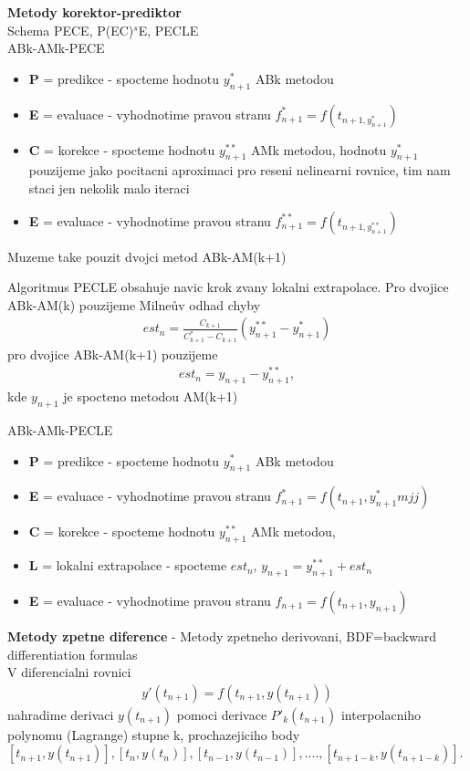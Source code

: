 \textbf{Metody korektor-prediktor} \\
Schema PECE, P(EC)$^{s}$E, PECLE \\
ABk-AMk-PECE
\begin{itemize}
\item \textbf{P} = predikce - spocteme hodnotu $y^{*}_{n+1}$ ABk metodou 
\item \textbf{E} = evaluace - vyhodnotime pravou stranu $f^{*}_{n+1}=f(t_{n+1,y^{*}_{n+1}})$
\item \textbf{C} = korekce - spocteme hodnotu $y^{**}_{n+1}$ AMk metodou, hodnotu $y^{*}_{n+1}$ pouzijeme jako pocitacni aproximaci pro reseni nelinearni rovnice, tim nam staci jen nekolik malo iteraci
\item \textbf{E} = evaluace - vyhodnotime pravou stranu $f^{**}_{n+1}=f(t_{n+1,y^{**}_{n+1}})$
\end{itemize}

Muzeme take pouzit dvojci metod ABk-AM(k+1)

Algoritmus PECLE obsahuje navic krok zvany lokalni extrapolace. Pro dvojice ABk-AM(k) pouzijeme Milneův odhad  chyby 
\begin{align}
est_{n}=\frac{C_{k+1}}{C^{*}_{k+1}-C_{k+1}}(y^{**}_{n+1}-y^{*}_{n+1})
\end{align}
pro dvojice ABk-AM(k+1) pouzijeme
\begin{align}
est_{n}=y_{n+1}-y^{**}_{n+1},
\end{align}
kde $y_{n+1}$ je spocteno metodou AM(k+1)

ABk-AMk-PECLE
\begin{itemize}
\item \textbf{P} = predikce - spocteme hodnotu $y^{*}_{n+1}$ ABk metodou 
\item \textbf{E} = evaluace - vyhodnotime pravou stranu $f^{*}_{n+1}=f(t_{n+1},y^{*}_{n+1}mjj)$
\item \textbf{C} = korekce - spocteme hodnotu $y^{**}_{n+1}$ AMk metodou, 
\item \textbf{L} = lokalni extrapolace - spocteme $est_{n}$,  $y_{n+1}=y^{**}_{n+1}+est_{n}$
\item \textbf{E} = evaluace - vyhodnotime pravou stranu $f_{n+1}=f(t_{n+1},y_{n+1})$
\end{itemize}

\textbf{Metody zpetne diference}
- Metody zpetneho derivovani, BDF=backward differentiation formulas \\

V diferencialni rovnici
\begin{align}
y'(t_{n+1})=f(t_{n+1},y(t_{n+1}))
\end{align}
nahradime derivaci $y(t_{n+1})$ pomoci derivace $P'_{k}(t_{n+1})$ interpolacniho polynomu (Lagrange) stupne k, prochazejiciho body $[t_{n+1},y(t_{n+1})],[t_{n},y(t_{n})], [t_{n-1},y(t_{n-1})],...., [t_{n+1-k},y(t_{n+1-k})]$. 

